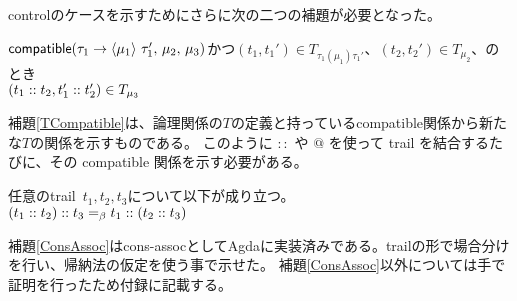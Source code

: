 controlのケースを示すためにさらに次の二つの補題が必要となった。
\begin{lemma}\upshape
  $\Compatible{\Trail{\tau_1}{\tau_1'}{\mu_1}}{\mu_2}{\mu_3}$かつ$(t_1, t_1')\in T_{\tau_1(\mu_1)\tau_1'}、(t_2, t_2')\in T_{\mu_2}、$のとき\\
  $(\Cons{t_1}{t_2}, \Cons{t_1'}{t_2'})\in T_{\mu_3}$
\label{TCompatible}
\end{lemma}
補題\ref{TCompatible}は、論理関係の$T$の定義と持っている\textsf{compatible}関係から新たな$T$の関係を示すものである。
このように $::$ や $@$ を使って trail を結合するたびに、その
\textsf{compatible} 関係を示す必要がある。

\begin{lemma}\upshape
  任意のtrail\ $t_1,t_2,t_3$について以下が成り立つ。\\
  $\Cons{\ConsP{t_1}{t_2}}{t_3} =_{\beta} \Cons{t_1}{\ConsP{t_2}{t_3}}$
\label{ConsAssoc}
\end{lemma}
補題\ref{ConsAssoc}は\textsf{cons-assoc}としてAgdaに実装済みである。trailの形で場合分けを行い、帰納法の仮定を使う事で示せた。
補題\ref{ConsAssoc}以外については手で証明を行ったため付録に記載する。

